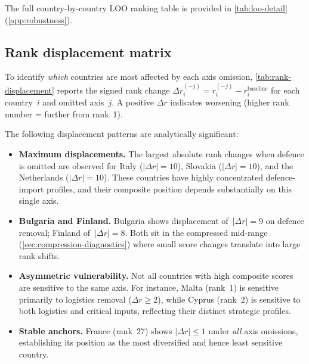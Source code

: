 The full country-by-country LOO ranking table is provided in
\cref{tab:loo-detail} (\cref{app:robustness}).

\subsection{Rank displacement matrix}\label{sec:rank-displacement}

To identify \emph{which} countries are most affected by each axis
omission, \cref{tab:rank-displacement} reports the signed rank change
$\Delta r_i^{(-j)} = r_i^{(-j)} - r_i^{\text{baseline}}$ for each
country~$i$ and omitted axis~$j$.  A positive $\Delta r$ indicates
worsening (higher rank number = further from rank~1).



The following displacement patterns are analytically significant:

\begin{itemize}[leftmargin=2em]
  \item \textbf{Maximum displacements.}  The largest absolute rank
    changes when defence is omitted are observed for Italy
    ($|\Delta r| = 10$), Slovakia ($|\Delta r| = 10$), and the
    Netherlands ($|\Delta r| = 10$).  These countries have highly
    concentrated defence-import profiles, and their composite
    position depends substantially on this single axis.

  \item \textbf{Bulgaria and Finland.}  Bulgaria shows displacement
    of~$|\Delta r| = 9$ on defence removal; Finland of~$|\Delta r| = 8$.
    Both sit in the compressed mid-range (\cref{sec:compression-diagnostics})
    where small score changes translate into large rank shifts.

  \item \textbf{Asymmetric vulnerability.}  Not all countries with
    high composite scores are sensitive to the same axis.  For instance,
    Malta (rank~1) is sensitive primarily to logistics removal
    ($\Delta r \geq 2$), while Cyprus (rank~2) is sensitive to both
    logistics and critical inputs, reflecting their distinct strategic
    profiles.

  \item \textbf{Stable anchors.}  France (rank~27) shows
    $|\Delta r| \leq 1$ under \emph{all} axis omissions, establishing
    its position as the most diversified and hence least sensitive
    country.
\end{itemize}

